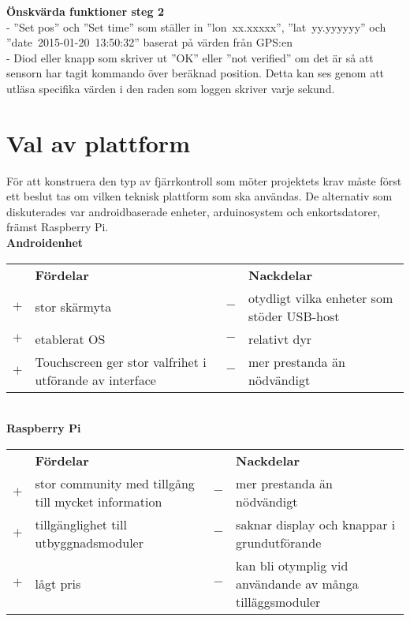 \documentclass{article}
\begin{document}
		\noindent \textbf{Önskvärda funktioner steg 2} \\
		-	”Set pos” och ”Set time” som ställer in \hbox{''lon xx.xxxxx''}, \hbox{''lat yy.yyyyyy''} och \hbox{''date 2015-01-20 13:50:32''} baserat på värden från GPS:en \\

		\noindent- Diod eller knapp som skriver ut ”OK” eller ”not verified” om det är så att sensorn har tagit kommando över beräknad position. Detta kan ses genom att utläsa specifika värden i den raden som loggen skriver varje sekund.

	\newpage

	\section*{Val av plattform} %
	\label{sec:val_av_plattform}

		För att konstruera den typ av fjärrkontroll som möter projektets krav måste först ett beslut tas om vilken teknisk plattform som ska användas. De alternativ som diskuterades var androidbaserade enheter, arduinosystem och enkortsdatorer, främst Raspberry Pi.\\

		\noindent\textsf{\textbf{Androidenhet}}\\
		\begin{tabularx}{\textwidth}{@{}cXcX}
			& \textbf{Fördelar} 	& & \textbf{Nackdelar} \\
			$+$ & stor skärmyta 	&	$-$ & otydligt vilka enheter som stöder 								USB-host \\
			$+$ &  etablerat OS 	& $-$ & relativt dyr \\
			$+$	&  Touchscreen ger stor valfrihet i utförande av interface				& $-$ & mer prestanda än nödvändigt
		\end{tabularx}\\

			
		\noindent\textsf{\textbf{Raspberry Pi}}\\
		\begin{tabularx}{\textwidth}{@{}cXcX}
			& \textbf{Fördelar} 	& & \textbf{Nackdelar} \\
			$+$ & stor community med tillgång till mycket information & $-$ & mer prestanda än nödvändigt \\
			$+$ & tillgänglighet till utbyggnadsmoduler & $-$ & saknar display och knappar i grundutförande \\
			$+$ & lågt pris&	$-$ & kan bli otymplig vid användande av många tilläggsmoduler \\	
		\end{tabularx}\\
\end{document}
